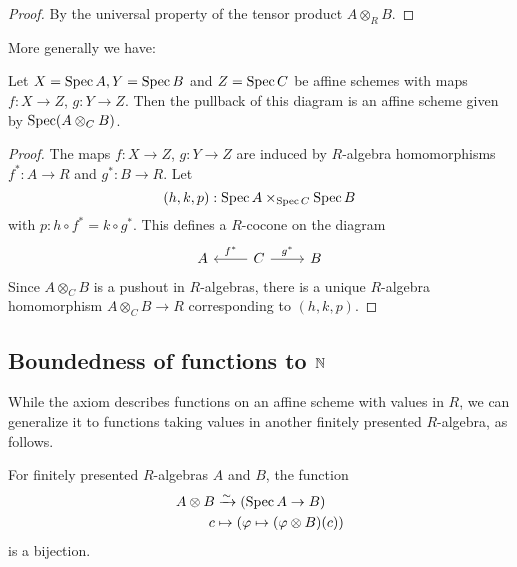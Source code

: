 \begin{proof}
  By the universal property of the tensor product $A \otimes_R B$.
\end{proof}

More generally we have:

\begin{lemma}%
  \label{affine-fiber-product}
  Let $X=\operatorname{Spec} A,Y=\operatorname{Spec} B$ and $Z=\operatorname{Spec} C$ be affine schemes
  with maps $f:X\to Z$, $g:Y\to Z$.
  Then the pullback of this diagram is an affine scheme given by $\operatorname{Spec} (A\otimes_C B)$.
\end{lemma}

\begin{proof}
  The maps $f:X\to Z$, $g:Y\to Z$ are induced by $R$-algebra homomorphisms $f^*:A\to R$ and $g^*:B\to R$.
  Let
  \[ (h,k,p) : \operatorname{Spec} A \times_{\operatorname{Spec} C} \operatorname{Spec} B \]
  with $p:h\circ f^*=k\circ g^* $.
  This defines a $R$-cocone on the diagram
  \[
    \begin{tikzcd}
      A & C\ar[r,"g^*"]\ar[l,"f^*",swap] & B
    \end{tikzcd}
  \]
  Since $A\otimes_C B$ is a pushout in $R$-algebras,
  there is a unique $R$-algebra homomorphism $A\otimes_C B \to R$ corresponding to $(h,k,p)$.
\end{proof}

\subsection{Boundedness of functions to $\mathbb{N}$}

While the axiom 
describes functions on an affine scheme
with values in $R$,
we can generalize it to functions taking values
in another finitely presented $R$-algebra,
as follows.

\begin{lemma}%
  \label{algebra-valued-functions-on-affine}
  For finitely presented $R$-algebras $A$ and $B$,
  the function
  \begin{align*}
    A \otimes B &\xrightarrow{\sim} (\operatorname{Spec} A \to B) \\
    c &\mapsto (\varphi \mapsto (\varphi \otimes B)(c))
  \end{align*}
  is a bijection.
\end{lemma}

